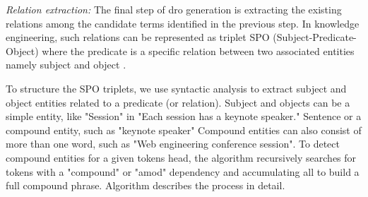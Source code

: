 \emph{Relation extraction:} The final step of \gls{dro} generation is
extracting the existing relations among the candidate terms identified
in the previous step. In knowledge engineering, such relations can be
represented as ﻿triplet SPO (Subject-Predicate-Object) where the
predicate is a specific relation between two associated entities namely
subject and object \autocite{Li2020}.

To structure the SPO triplets, we use syntactic analysis to extract
subject and object entities related to a predicate (or relation).
Subject and objects can be a simple entity, like "Session" in "Each
session has a keynote speaker." Sentence or a compound entity, such as
"keynote speaker" Compound entities can also consist of more than one
word, such as "Web engineering conference session". To detect compound
entities for a given token\textquotesingle s head, the algorithm
recursively searches for tokens with a "compound" or "amod" dependency
and accumulating all to build a full compound phrase. Algorithm
 describes the process in detail.
 

